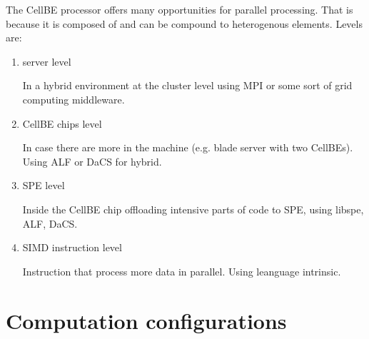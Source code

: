 The CellBE processor offers many opportunities for parallel processing. That is because it is composed of and can be compound to heterogenous elements. Levels are:
\begin{enumerate}
\item server level
\par
In a hybrid environment at the cluster level using MPI or some sort of grid computing middleware.

\item CellBE chips level
\par
In case there are more in the machine (e.g. blade server with two CellBEs). Using ALF or DaCS for hybrid.

\item SPE level
\par
Inside the CellBE chip offloading intensive parts of code to SPE, using libspe, ALF, DaCS.

\item SIMD instruction level
\par
Instruction that process more data in parallel. Using leanguage intrinsic.
\end{enumerate}

\section{Computation configurations}

